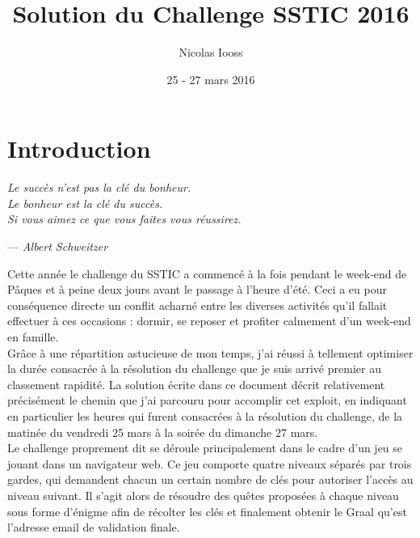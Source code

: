 \documentclass[a4paper,10pt]{article}
\title{Solution du Challenge SSTIC 2016}
\author{Nicolas Iooss}
\date{25 - 27 mars 2016}
\newcommand{\epiquote}[2]{\epigraph{\small\itshape{#1}}{--- \itshape{#2}}}
\begin{document}
\maketitle

\section*{Introduction}

\epiquote{Le succès n’est pas la clé du bonheur.\\Le bonheur est la clé du succès.\\Si vous aimez ce que vous faites vous réussirez.}{Albert Schweitzer}

Cette année le challenge du SSTIC a commencé à la fois pendant le week-end de Pâques et à peine deux jours avant le passage à l'heure d'été.
Ceci a eu pour conséquence directe un conflit acharné entre les diverses activités qu'il fallait effectuer à ces occasions : dormir, se reposer et profiter calmement d'un week-end en famille.
\\

Grâce à une répartition astucieuse de mon temps, j'ai réussi à tellement optimiser la durée consacrée à la résolution du challenge que je suis arrivé premier au classement rapidité.
La solution écrite dans ce document décrit relativement précisément le chemin que j'ai parcouru pour accomplir cet exploit, en indiquant en particulier les heures qui furent consacrées à la résolution du challenge, de la matinée du vendredi 25 mars à la soirée du dimanche 27 mars.
\\

Le challenge proprement dit se déroule principalement dans le cadre d'un jeu se jouant dans un navigateur web.
Ce jeu comporte quatre niveaux séparés par trois gardes, qui demandent chacun un certain nombre de clés pour autoriser l'accès au niveau suivant.
Il s'agit alors de résoudre des quêtes proposées à chaque niveau sous forme d'énigme afin de récolter les clés et finalement obtenir le Graal qu'est l'adresse email de validation finale.


\clearpage
\tableofcontents

\clearpage


\clearpage
\begin{appendices}

\end{appendices}
\end{document}
